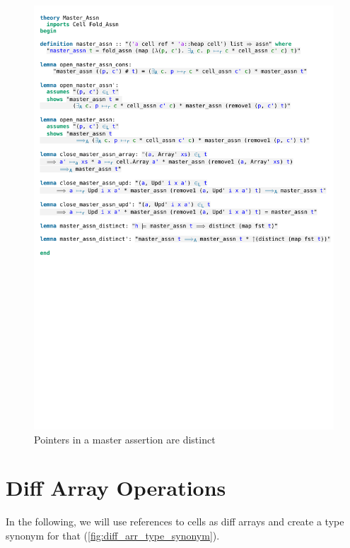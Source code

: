 \begin{figure}[htpb]
    \includegraphics[trim={0 13,1cm 0 15,2cm}, clip, width=1.00\textwidth]{figures/Theory_Master_Assn.pdf}
    \caption[Pointers in a master assertion are distinct]{Pointers in a master assertion are distinct}
    \label{fig:master_assn_distinct}
\end{figure}

\section{Diff Array Operations}\label{section:diff_arr_operations}

In the following, we will use references to cells as diff arrays and create a type synonym for that (\autoref{fig:diff_arr_type_synonym}).

